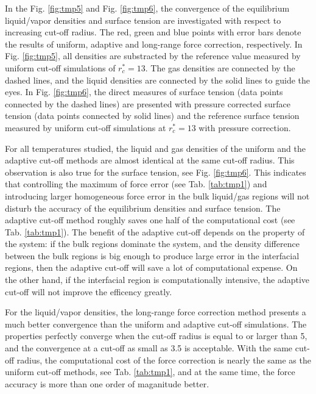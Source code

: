 \documentclass[aps,pre,preprint]{revtex4}
\begin{document}
In the Fig. \ref{fig:tmp5} and Fig. \ref{fig:tmp6}, the convergence of
the equilibrium liquid/vapor densities and surface tension are
investigated with respect to increasing cut-off radius. The red, green
and blue points with error bars denote the results of uniform,
adaptive and long-range force correction, respectively.
In Fig. \ref{fig:tmp5}, all densities are substracted by the reference
value measured by uniform cut-off simulations of $r_c^\ast = 13$.  The
gas densities are connected by the dashed lines, and the liquid
densities are connected by the solid lines to guide the eyes.  In
Fig. \ref{fig:tmp6}, the direct measures of surface tension (data
points connected by the dashed lines) are presented with pressure
corrected surface tension (data points connected by solid lines) and
the reference surface tension measured by uniform cut-off simulations
at $r_c^\ast = 13$ with pressure correction.


For all temperatures studied, the liquid and gas densities of the
uniform and the adaptive cut-off methods are almost identical at the
same cut-off radius. This observation is also true for the surface
tension, see Fig. \ref{fig:tmp6}. This indicates that controlling the
maximum of force error (see Tab. \ref{tab:tmp1}) and introducing
larger homogeneous force error in the bulk liquid/gas regions will not
disturb the accuracy of the equilibrium densities and surface tension.
The adaptive cut-off method roughly saves one half of the
computational cost (see Tab. \ref{tab:tmp1}). The benefit of the
adaptive cut-off depends on the property of the system: if the bulk
regions dominate the system, and the density difference between the
bulk regions is big enough to produce large error in the interfacial regions,
then the adaptive cut-off will save a lot of
computational expense. On the other hand, if the interfacial region is
computationally intensive, the adaptive cut-off will not improve the efficency
greatly.

For the liquid/vapor densities, the long-range force correction method
presents a much better convergence than the uniform and adaptive
cut-off simulations. The properties perfectly converge when the cut-off
radius is equal to or larger than 5, and the convergence at a cut-off
as small as 3.5 is acceptable.  With the same cut-off radius, the
computational cost of the force correction is nearly the same as the
uniform cut-off methods, see Tab. \ref{tab:tmp1}, and at the same
time, the force accuracy is more than one order of maganitude better.
\end{document}
